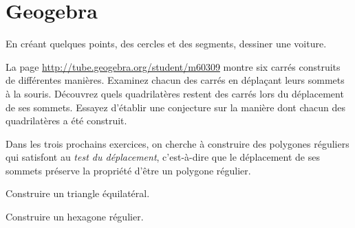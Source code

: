 
\section{Geogebra}


\begin{exercice}
En créant quelques points, des cercles et des segments, dessiner une voiture.
\end{exercice}

\begin{exercice}
La page \url{http://tube.geogebra.org/student/m60309} montre six carrés
construits de différentes manières.  Examinez chacun des carrés en déplaçant
leurs sommets à la souris. Découvrez quels quadrilatères restent des carrés lors
du déplacement de ses sommets. Essayez d'établir une conjecture sur la manière
dont chacun des quadrilatères a été construit.
\end{exercice}

Dans les trois prochains exercices, on cherche à construire des polygones
réguliers qui satisfont au \emph{test du déplacement}, c'est-à-dire que le
déplacement de ses sommets préserve la propriété d'être un polygone régulier.

\begin{exercice}
Construire un triangle équilatéral. 
\end{exercice}

\begin{exercice}
Construire un hexagone régulier.
\end{exercice}




